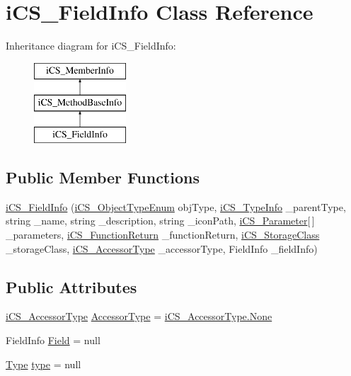 \hypertarget{classi_c_s___field_info}{\section{i\+C\+S\+\_\+\+Field\+Info Class Reference}
\label{classi_c_s___field_info}
}
Inheritance diagram for i\+C\+S\+\_\+\+Field\+Info\+:\begin{figure}[H]
\begin{center}
\leavevmode
\includegraphics[height=3.000000cm]{classi_c_s___field_info}
\end{center}
\end{figure}
\subsection*{Public Member Functions}
\begin{DoxyCompactItemize}
\item 
\hyperlink{classi_c_s___field_info_af280926bb2cfbb8668dcfbe67f860706}{i\+C\+S\+\_\+\+Field\+Info} (\hyperlink{i_c_s___object_type_enum_8cs_ae6c3dd6d8597380b56d94908eb431547}{i\+C\+S\+\_\+\+Object\+Type\+Enum} obj\+Type, \hyperlink{classi_c_s___type_info}{i\+C\+S\+\_\+\+Type\+Info} \+\_\+parent\+Type, string \+\_\+name, string \+\_\+description, string \+\_\+icon\+Path, \hyperlink{classi_c_s___parameter}{i\+C\+S\+\_\+\+Parameter}\mbox{[}$\,$\mbox{]} \+\_\+parameters, \hyperlink{classi_c_s___function_return}{i\+C\+S\+\_\+\+Function\+Return} \+\_\+function\+Return, \hyperlink{i_c_s___storage_class_8cs_a4e1bb1da155050e4b0d0118f813194aa}{i\+C\+S\+\_\+\+Storage\+Class} \+\_\+storage\+Class, \hyperlink{i_c_s___accessor_type_8cs_ad7e8f7d8ee47401a5018d852892043d9}{i\+C\+S\+\_\+\+Accessor\+Type} \+\_\+accessor\+Type, Field\+Info \+\_\+field\+Info)
\end{DoxyCompactItemize}
\subsection*{Public Attributes}
\begin{DoxyCompactItemize}
\item 
\hyperlink{i_c_s___accessor_type_8cs_ad7e8f7d8ee47401a5018d852892043d9}{i\+C\+S\+\_\+\+Accessor\+Type} \hyperlink{classi_c_s___field_info_a76f3b6bd8df1cc30997392d8d21f8cf1}{Accessor\+Type} = \hyperlink{i_c_s___edge_enum_8cs_af0c43d9550817659c245d5d49fbb4771a6adf97f83acf6453d4a6a4b1070f3754}{i\+C\+S\+\_\+\+Accessor\+Type.\+None}
\item 
Field\+Info \hyperlink{classi_c_s___field_info_ada380e14b9b7de31ea12a63e676de1e8}{Field} = null
\item 
\hyperlink{i_c_s___object_type_enum_8cs_ae6c3dd6d8597380b56d94908eb431547aa1fa27779242b4902f7ae3bdd5c6d508}{Type} \hyperlink{classi_c_s___field_info_aa8277d721ae4730d8202cd87ba33f437}{type} = null
\end{DoxyCompactItemize}

